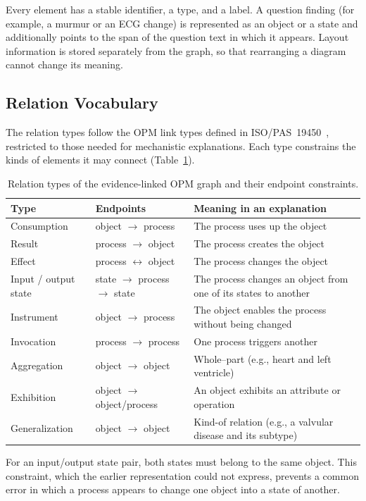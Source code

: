 Every element has a stable identifier, a type, and a label. A question finding (for example, a murmur or an ECG change) is represented as an object or a state and additionally points to the span of the question text in which it appears. Layout information is stored separately from the graph, so that rearranging a diagram cannot change its meaning.

\subsection{Relation Vocabulary}

The relation types follow the OPM link types defined in ISO/PAS~19450~\cite{iso_19450_2015}, restricted to those needed for mechanistic explanations. Each type constrains the kinds of elements it may connect (Table~\ref{tab:relations}).

\begin{table}[H]
\centering
\caption{Relation types of the evidence-linked OPM graph and their endpoint constraints.}
\label{tab:relations}
\small
\begin{tabularx}{\linewidth}{l l >{\raggedright\arraybackslash}X}
\toprule
Type & Endpoints & Meaning in an explanation \\
\midrule
Consumption & object $\to$ process & The process uses up the object \\
Result & process $\to$ object & The process creates the object \\
Effect & process $\leftrightarrow$ object & The process changes the object \\
Input / output state & state $\to$ process $\to$ state & The process changes an object from one of its states to another \\
Instrument & object $\to$ process & The object enables the process without being changed \\
Invocation & process $\to$ process & One process triggers another \\
Aggregation & object $\to$ object & Whole--part (e.g., heart and left ventricle) \\
Exhibition & object $\to$ object/process & An object exhibits an attribute or operation \\
Generalization & object $\to$ object & Kind-of relation (e.g., a valvular disease and its subtype) \\
\bottomrule
\end{tabularx}
\end{table}

For an input/output state pair, both states must belong to the same object. This constraint, which the earlier representation could not express, prevents a common error in which a process appears to change one object into a state of another.

